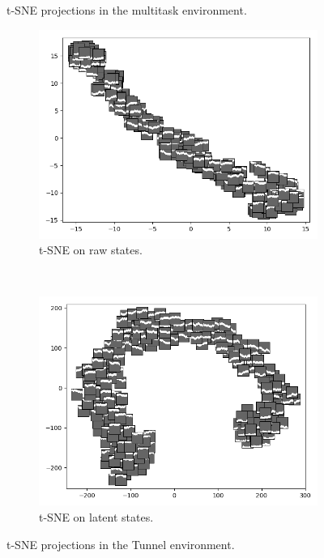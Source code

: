 \begin{figure}[t!]
	\caption{t-SNE projections in the multitask environment.}
	\label{fig:tsne-multitask}
\end{figure}

\begin{figure}[t!]
	\centering
	\begin{subfigure}{0.46\columnwidth}
		\centering
		\includegraphics[width=\linewidth]{documentation/report/img/tunnel_state.png}
		\caption{t-SNE on raw states.}
		\label{subfig:tsne_tunnel_states}
	\end{subfigure}%
	~ 
	\begin{subfigure}{0.46\columnwidth}
		\centering
		\includegraphics[width=\linewidth]{documentation/report/img/tunnel_latent.png}
		\caption{t-SNE on latent states.}
		\label{subfig:tsne_tunnel_latent}
	\end{subfigure}

	\caption{t-SNE projections in the Tunnel environment.}
	\label{fig:tsne-tunnel}
\end{figure}

